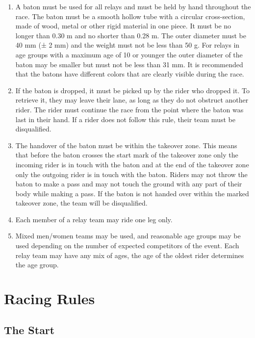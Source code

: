 \begin{enumerate}[leftmargin=1.5em,labelsep=*]
	\item A baton must be used for all relays and must be held by hand throughout the race.
	The baton must be a smooth hollow tube with a circular cross-section, made of wood, metal or other rigid material in one piece.
	It must be no longer than 0.30 m and no shorter than 0.28 m.
	The outer diameter must be 40 mm (± 2 mm) and the weight must not be less than 50 g.
	For relays in age groups with a maximum age of 10 or younger the outer diameter of the baton may be smaller but 
	must not be less than 31 mm.
	It is recommended that the batons have different colors that are clearly visible during the race.
	
	\item If the baton is dropped, it must be picked up by the rider who dropped it.
	To retrieve it, they may leave their lane, as long as they do not obstruct another rider.
	The rider must continue the race from the point where the baton was last in their hand.
	If a rider does not follow this rule, their team must be disqualified.
	
	\item The handover of the baton must be within the takeover zone.
	This means that before the baton crosses the start mark of the takeover zone only the 
  incoming rider is in touch with the baton and at the end of the takeover zone only the 
  outgoing rider is in touch with the baton.
	Riders may not throw the baton to make a pass and may not touch the ground with any part of 
  their body while making a pass.
	If the baton is not handed over within the marked takeover zone, the team will be disqualified.
	
	\item Each member of a relay team may ride one leg only.
	
	\item Mixed men/women teams may be used, and reasonable age groups may be used depending on the 
  number of expected competitors of the event.
	Each relay team may have any mix of ages, the age of the oldest rider determines the age group.
\end{enumerate}

\section{Racing Rules}

\subsection{The Start \label{subsec:track_racing_start}}

